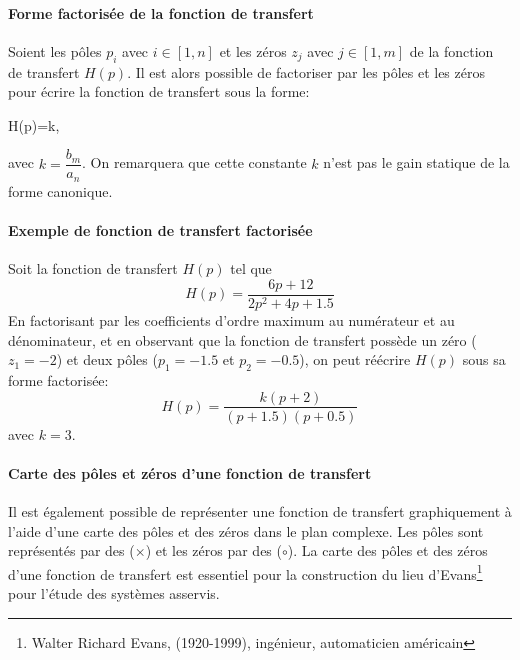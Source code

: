 \paragraph{Forme factorisée de la fonction de transfert}
Soient les pôles $p_i$ avec $i\in[1,n]$ et les zéros $z_j$ 
avec $j\in[1,m]$ de la fonction de transfert $H(p)$. 
Il est alors possible de factoriser par les pôles et les zéros pour écrire la fonction de 
transfert sous la forme:
\begin{bequation}
H(p)=k\cdot{},
\end{bequation}
avec $k=\dfrac{b_m}{a_n}$. On remarquera que cette constante $k$ 
n'est pas le gain statique de la forme canonique.

\paragraph{Exemple de fonction de transfert factorisée}

Soit la fonction de transfert $H(p)$ tel que
$$
H(p)=\dfrac{6p+12}{2p^2+4p+1.5}	
$$
En factorisant par les coefficients d'ordre maximum au numérateur et au dénominateur, et en observant 
que la fonction de transfert possède un zéro ($z_1=-2$) et deux pôles ($p_1=-1.5$ et $p_2=-0.5$), 
on peut réécrire $H(p)$ sous sa forme factorisée:
$$
H(p)=\dfrac{k(p+2)}{(p+1.5)(p+0.5)}
$$
avec $k=3$.
	
\paragraph{Carte des pôles et zéros d'une fonction de transfert}

Il est également possible de représenter une fonction de transfert graphiquement à 
l'aide d'une carte des pôles et des zéros dans le plan complexe. Les pôles 
sont représentés par des ($\times$) et les zéros par des ($\circ$).
La carte des pôles et des zéros d'une fonction de transfert est essentiel pour la
construction du lieu d'Evans\footnote{Walter Richard Evans, (1920-1999), ingénieur, automaticien américain} 
pour l'étude des systèmes asservis.

